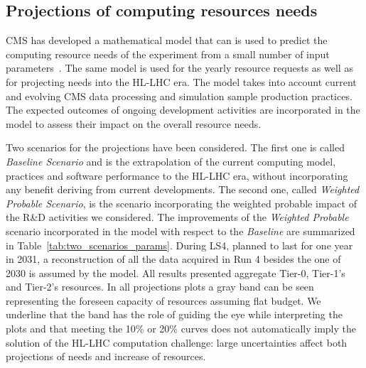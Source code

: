 \documentclass{cmspaper}
\begin{document}
\subsection{Projections of computing resources needs}
\label{sec:projections}
CMS has developed a mathematical model that can is used to predict the computing resource needs of the experiment from a small number of input parameters~\cite{model:Chep2019}. The same model is used for the yearly resource requests as well as for projecting needs into the HL-LHC era. The model takes into account current and evolving CMS data processing and simulation sample production practices. The expected outcomes of ongoing development activities are incorporated in the model to assess their impact on the overall resource needs. 

Two scenarios for the projections have been considered. The first one is called \textit{Baseline Scenario} and is the extrapolation of the current computing model, practices and software performance to the HL-LHC era, without incorporating any benefit deriving from current developments. The second one, called \textit{Weighted Probable Scenario}, is the scenario incorporating the weighted probable impact of the R\&D activities we considered. The improvements of the \textit{Weighted Probable} scenario incorporated in the model with respect to the \textit{Baseline} are summarized in Table~\ref{tab:two_scenarios_params}. During LS4, planned to last for one year in 2031, a reconstruction of all the data acquired in Run 4 besides the one of 2030 is assumed by the model. All results presented aggregate Tier-0, Tier-1's and Tier-2's resources.
In all projections plots a gray band can be seen representing the foreseen capacity of resources assuming flat budget. We underline that the band has the role of guiding the eye while interpreting the plots and that meeting the 10\% or 20\% curves does not automatically imply the solution of the HL-LHC computation challenge: large uncertainties affect both projections of needs and increase of resources. 
\end{document}
